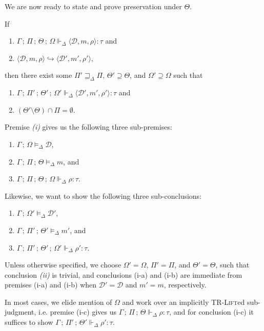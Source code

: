 \documentclass{article}
\newcommand{\mc}[1]{\mathcal{#1}}
\newcommand{\ts}[1]{\textsc{#1}}
\newcommand{\semi}{\,;\,}
\newcommand{\trip}[3]{\langle #1, #2, #3 \rangle}
\newcommand{\rtp}{\tau}
\newcommand{\tdef}[3]{#1 \semi #2 \vDash_\Delta #3}
\newcommand{\tmeml}[4]{#1 \semi #2 \semi #3 \vDash_\Delta #4}
\newcommand{\trhol}[5]{#1 \semi #2 \semi #3 \Vdash_\Delta #4: #5}
\newcommand{\trhop}[6]{#1 \semi #2 \semi #3 \semi #4 \Vdash_\Delta #5: #6}
\newcommand{\tcfgl}[8]{#1 \semi #2 \semi #3 \semi #4 \Vdash_\Delta \trip{#5}{#6}{#7} : #8}
\newcommand{\rpodl}{\sqsupseteq_\Delta}
\newcommand{\cstep}[6]{\trip{#1}{#2}{#3} \hookrightarrow \trip{#4}{#5}{#6}}
\newcommand{\D}{\mc{D}}
\begin{document}
We are now ready to state and prove preservation under $\Theta$.

\begin{lemma}
\label{thm:prezcfgl}
If \begin{enumerate}[label=(\roman*)]
\item $\tcfgl{\Gamma}{\Pi}{\Theta}{\Omega}{\D}{m}{\rho}{\rtp}$ and
\item $\cstep{\D}{m}{\rho}{\D'}{m'}{\rho'}$,
\end{enumerate}
then there exist some $\Pi' \rpodl \Pi$, $\Theta' \supseteq \Theta$,
and $\Omega' \supseteq \Omega$ such that
\begin{enumerate}[label=(\roman*)]
\item $\tcfgl{\Gamma}{\Pi'}{\Theta'}{\Omega'}{\D'}{m'}{\rho'}{\rtp}$ and
\item $(\Theta' \setminus \Theta) \cap \Pi = \emptyset$.
\end{enumerate}

\begin{Proof}
Premise \emph{(i)} gives us the following three sub-premises:
\begin{enumerate}[label=(i-\alph*)]
\item $\tdef{\Gamma}{\Omega}{\D}$,
\item $\tmeml{\Gamma}{\Pi}{\Theta}{m}$, and
\item $\trhop{\Gamma}{\Pi}{\Theta}{\Omega}{\rho}{\rtp}$.
\end{enumerate}

Likewise, we want to show the following three sub-conclusions:
\begin{enumerate}[label=(i-\alph*)]
\item $\tdef{\Gamma}{\Omega'}{\D'}$,
\item $\tmeml{\Gamma}{\Pi'}{\Theta'}{m'}$, and
\item $\trhop{\Gamma}{\Pi'}{\Theta'}{\Omega'}{\rho'}{\rtp}$.
\end{enumerate}

Unless otherwise specified, we choose $\Omega'=\Omega$,
$\Pi'=\Pi$, and $\Theta'=\Theta$, such that conclusion \emph{(ii)}
is trivial, and conclusions (i-a)
and (i-b) are immediate from premises (i-a) and (i-b)
when $\D'=\D$ and $m'=m$, respectively.

In most cases, we elide mention of $\Omega$
and work over an implicitly \ts{TR-Lift}ed sub-judgment,
i.e. premise (i-c) gives us $\trhol{\Gamma}{\Pi}{\Theta}{\rho}{\rtp}$,
and for conclusion (i-c) it suffices to show
$\trhol{\Gamma}{\Pi'}{\Theta'}{\rho'}{\rtp}$.


\end{Proof}
\end{lemma}
\end{document}
